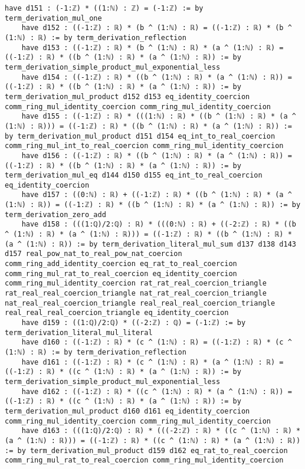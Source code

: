 \documentclass{article}
\begin{document}
\begin{tcolorbox}[colback=white!10, width=\linewidth]
\begin{lstlisting}[language=Lean4]
    have d151 : (-1:ℤ) * ((1:ℕ) : ℤ) = (-1:ℤ) := by term_derivation_mul_one
    have d152 : ((-1:ℤ) : ℝ) * (b ^ (1:ℕ) : ℝ) = ((-1:ℤ) : ℝ) * (b ^ (1:ℕ) : ℝ) := by term_derivation_reflection
    have d153 : ((-1:ℤ) : ℝ) * (b ^ (1:ℕ) : ℝ) * (a ^ (1:ℕ) : ℝ) = ((-1:ℤ) : ℝ) * ((b ^ (1:ℕ) : ℝ) * (a ^ (1:ℕ) : ℝ)) := by term_derivation_simple_product_mul_exponential_less
    have d154 : ((-1:ℤ) : ℝ) * ((b ^ (1:ℕ) : ℝ) * (a ^ (1:ℕ) : ℝ)) = ((-1:ℤ) : ℝ) * ((b ^ (1:ℕ) : ℝ) * (a ^ (1:ℕ) : ℝ)) := by term_derivation_mul_product d152 d153 eq_identity_coercion comm_ring_mul_identity_coercion comm_ring_mul_identity_coercion
    have d155 : ((-1:ℤ) : ℝ) * (((1:ℕ) : ℝ) * ((b ^ (1:ℕ) : ℝ) * (a ^ (1:ℕ) : ℝ))) = ((-1:ℤ) : ℝ) * ((b ^ (1:ℕ) : ℝ) * (a ^ (1:ℕ) : ℝ)) := by term_derivation_mul_product d151 d154 eq_int_to_real_coercion comm_ring_mul_int_to_real_coercion comm_ring_mul_identity_coercion
    have d156 : ((-1:ℤ) : ℝ) * ((b ^ (1:ℕ) : ℝ) * (a ^ (1:ℕ) : ℝ)) = ((-1:ℤ) : ℝ) * ((b ^ (1:ℕ) : ℝ) * (a ^ (1:ℕ) : ℝ)) := by term_derivation_mul_eq d144 d150 d155 eq_int_to_real_coercion eq_identity_coercion
    have d157 : ((0:ℕ) : ℝ) + ((-1:ℤ) : ℝ) * ((b ^ (1:ℕ) : ℝ) * (a ^ (1:ℕ) : ℝ)) = ((-1:ℤ) : ℝ) * ((b ^ (1:ℕ) : ℝ) * (a ^ (1:ℕ) : ℝ)) := by term_derivation_zero_add
    have d158 : (((1:ℚ)/2:ℚ) : ℝ) * (((0:ℕ) : ℝ) + ((-2:ℤ) : ℝ) * ((b ^ (1:ℕ) : ℝ) * (a ^ (1:ℕ) : ℝ))) = ((-1:ℤ) : ℝ) * ((b ^ (1:ℕ) : ℝ) * (a ^ (1:ℕ) : ℝ)) := by term_derivation_literal_mul_sum d137 d138 d143 d157 real_pow_nat_to_real_pow_nat_coercion comm_ring_add_identity_coercion eq_rat_to_real_coercion comm_ring_mul_rat_to_real_coercion eq_identity_coercion comm_ring_mul_identity_coercion rat_rat_real_coercion_triangle rat_real_real_coercion_triangle nat_rat_real_coercion_triangle nat_real_real_coercion_triangle real_real_real_coercion_triangle real_real_real_coercion_triangle eq_identity_coercion
    have d159 : ((1:ℚ)/2:ℚ) * ((-2:ℤ) : ℚ) = (-1:ℤ) := by term_derivation_literal_mul_literal
    have d160 : ((-1:ℤ) : ℝ) * (c ^ (1:ℕ) : ℝ) = ((-1:ℤ) : ℝ) * (c ^ (1:ℕ) : ℝ) := by term_derivation_reflection
    have d161 : ((-1:ℤ) : ℝ) * (c ^ (1:ℕ) : ℝ) * (a ^ (1:ℕ) : ℝ) = ((-1:ℤ) : ℝ) * ((c ^ (1:ℕ) : ℝ) * (a ^ (1:ℕ) : ℝ)) := by term_derivation_simple_product_mul_exponential_less
    have d162 : ((-1:ℤ) : ℝ) * ((c ^ (1:ℕ) : ℝ) * (a ^ (1:ℕ) : ℝ)) = ((-1:ℤ) : ℝ) * ((c ^ (1:ℕ) : ℝ) * (a ^ (1:ℕ) : ℝ)) := by term_derivation_mul_product d160 d161 eq_identity_coercion comm_ring_mul_identity_coercion comm_ring_mul_identity_coercion
    have d163 : (((1:ℚ)/2:ℚ) : ℝ) * (((-2:ℤ) : ℝ) * ((c ^ (1:ℕ) : ℝ) * (a ^ (1:ℕ) : ℝ))) = ((-1:ℤ) : ℝ) * ((c ^ (1:ℕ) : ℝ) * (a ^ (1:ℕ) : ℝ)) := by term_derivation_mul_product d159 d162 eq_rat_to_real_coercion comm_ring_mul_rat_to_real_coercion comm_ring_mul_identity_coercion

\end{lstlisting}
\end{tcolorbox}
\end{document}
